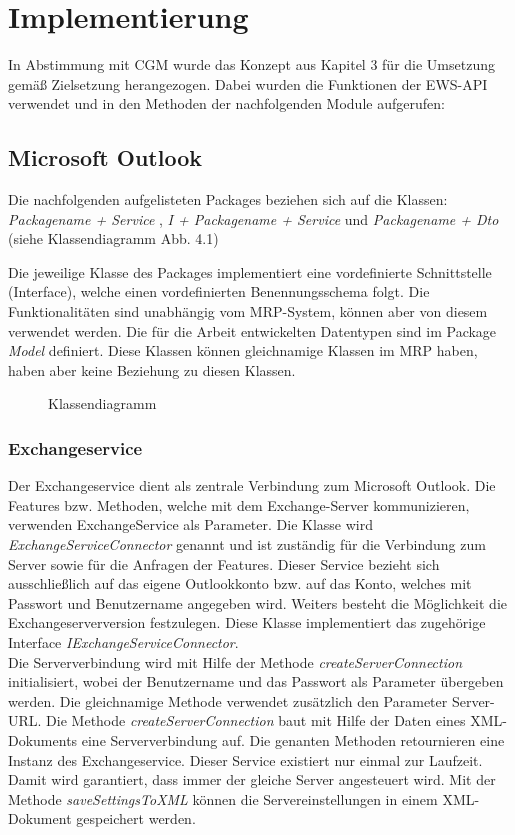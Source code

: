 \chapter{Implementierung}
In Abstimmung mit CGM wurde das Konzept aus Kapitel 3 für die Umsetzung gemäß Zielsetzung herangezogen. Dabei wurden die Funktionen der EWS-API verwendet und in den Methoden der nachfolgenden Module aufgerufen: 
\section{Microsoft Outlook}
Die nachfolgenden aufgelisteten Packages beziehen sich auf die Klassen: 
	 \textit{Packagename + Service },
	 \textit{I + Packagename + Service} und
	\textit{Packagename + Dto} (siehe Klassendiagramm Abb. 4.1)

Die jeweilige Klasse des Packages implementiert eine vordefinierte Schnittstelle (Interface), welche einen vordefinierten Benennungsschema folgt. Die Funktionalitäten sind unabhängig vom MRP-System, können aber von diesem verwendet werden. Die für die Arbeit entwickelten Datentypen sind im Package \textit{Model} definiert. Diese Klassen können gleichnamige Klassen im MRP haben, haben aber keine Beziehung zu diesen Klassen. \\


	\begin{figure}[H]
	\centering
\noindent{}
\caption{Klassendiagramm}
\end{figure}


\subsection{Exchangeservice}
Der Exchangeservice dient als zentrale Verbindung zum Microsoft Outlook. Die Features bzw. Methoden, welche mit dem Exchange-Server kommunizieren, verwenden ExchangeService als Parameter. Die Klasse wird \textit{ExchangeServiceConnector} genannt und ist zuständig für die Verbindung zum Server sowie für die Anfragen der Features. Dieser Service bezieht sich ausschließlich auf das eigene Outlookkonto bzw. auf das Konto, welches mit Passwort und Benutzername angegeben wird. Weiters besteht die Möglichkeit die Exchangeserverversion festzulegen. Diese Klasse implementiert das zugehörige Interface \textit{IExchangeServiceConnector}.\\ Die Serververbindung wird mit Hilfe der Methode \textit{createServerConnection} initialisiert, wobei der Benutzername und das Passwort als Parameter übergeben werden. Die gleichnamige Methode verwendet zusätzlich den Parameter Server-URL. Die Methode \textit{createServerConnection} baut mit Hilfe der Daten eines XML-Dokuments eine Serververbindung auf. Die genanten Methoden retournieren eine Instanz des Exchangeservice. Dieser Service existiert nur einmal zur Laufzeit. Damit wird garantiert, dass immer der gleiche Server angesteuert wird. Mit der Methode \textit{saveSettingsToXML} können die Servereinstellungen in einem XML-Dokument gespeichert werden. 
